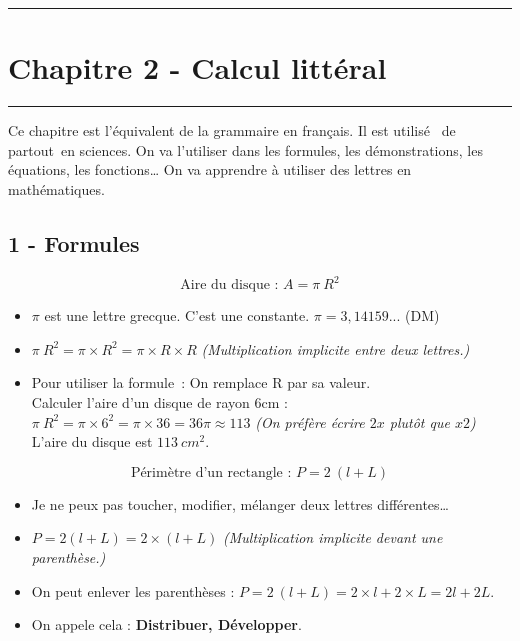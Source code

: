 \documentclass[11pt]{article}
\newcommand{\horrule}[1]{\rule{\linewidth}{#1}} %
\begin{document}

\newtheorem{Definition}{Définition}
\newtheorem{Theorem}{Théorème}
\newtheorem{Proposition}{Propriété}

\renewcommand{\labelitemi}{$\bullet$}
\renewcommand{\labelitemii}{$\circ$}

\setlength{\columnseprule}{1pt}

\horrule{2px}
\section*{Chapitre 2 - Calcul littéral}
\horrule{2px}


Ce chapitre est l’équivalent de la grammaire en français. Il est utilisé \og de partout \fg en sciences. On va l’utiliser dans les formules, les démonstrations, les équations, les fonctions… On va apprendre à utiliser des lettres en mathématiques.

\subsection*{1 - Formules}

$$\text{Aire du disque : }A = \pi ~ R^2$$

\begin{itemize}
\item $\pi$ est une lettre grecque. C’est une constante. $\pi = 3,14159 ...$ (DM)
\item $\pi ~ R^2 = \pi \times R^2 = \pi \times R \times R $ \textit{(Multiplication implicite entre deux lettres.)}
\item Pour utiliser la formule : On remplace R par sa valeur. \\
  Calculer l'aire d'un disque de rayon 6cm :\\
  $\pi ~ R^2 = \pi \times 6^2 =\pi \times 36 = 36\pi \approx 113$ \textit{(On préfère écrire $2x$ plutôt que $x2$)} \\
  L'aire du disque est $113 ~ cm^2$.
\end{itemize} 

$$\text{Périmètre d’un rectangle : }P = 2 ~ (l + L)$$
\begin{itemize}
\item Je ne peux pas toucher, modifier, mélanger deux lettres différentes…
\item $P = 2(l + L) = 2 \times (l + L)$ \textit{(Multiplication implicite devant une parenthèse.)}
\item On peut enlever les parenthèses : $P = 2 ~ (l + L) = 2\times l + 2\times L = 2l + 2L$.
\item On appele cela : \textbf{Distribuer, Développer}.
\end{itemize}
\end{document}
